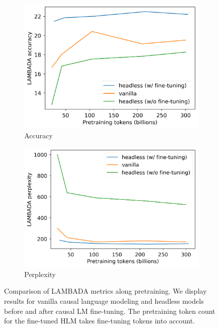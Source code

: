 \begin{figure}
    \centering
    \begin{subfigure}[b]{0.39\linewidth}
         \includegraphics[width=\linewidth]{sources/part_2/headless/imgs/lambada_acc_p13.png}
         \caption{Accuracy}
         \label{fig:lambada_acc}
    \end{subfigure}
    \begin{subfigure}[b]{0.41\linewidth}
         \includegraphics[width=\linewidth]{sources/part_2/headless/imgs/lambada_ppl_p13.png}
         \caption{Perplexity}
         \label{fig:lambada_ppl}
    \end{subfigure}
    \caption{Comparison of LAMBADA metrics along pretraining. We display results for vanilla causal language modeling and headless models before and after causal LM fine-tuning. The pretraining token count for the fine-tuned HLM takes fine-tuning tokens into account.}
    \label{fig:train_curve_lm}
\end{figure}


